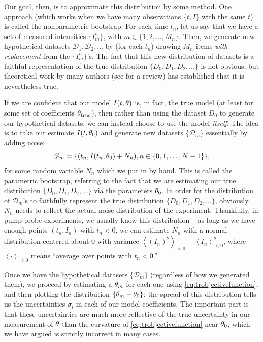 Our goal, then, is to approximate this distribution by some method.
One approach (which works when we have many observations $\{t, I\}$ with the same $t$) is called the nonparametric bootstrap\citep{cressie}.
For each time $t_n$, let us say that we have a set of measured intensities $\{I^n_m\}$, with $m\in \{1, 2, \ldots, M_n\}$.
Then, we generate new hypothetical datasets $\mathscr{D}_1, \mathscr{D}_2, \ldots$ by (for each $t_n$) drawing $M_n$ items \emph{with replacement} from the $\{I^n_m\}$'s.
The fact that this new distribution of datasets is a faithful representation of the true distribution $\{D_0, D_1, D_2, \ldots\}$ is not obvious, but theoretical work by many authors (see \citet{wackernagel} for a review) has established that it is nevertheless true.

If we are confident that our model $I(t, \theta)$ is, in fact, the true model (at least for some set of coefficients $\theta_\mathrm{true}$), then rather than using the dataset $D_0$ to generate our hypothetical datasets, we can instead choose to use the model \emph{itself}.
The idea is to take our estimate $I(t, \theta_0)$ and generate new datasets $\{\mathscr{D}_m\}$ essentially by adding noise:
\begin{equation}\label{eq:parametricbootstrap}
\mathscr{D}_m = \{(t_n, I(t_n, \theta_0)+N_n), n\in \{0, 1, \ldots, N-1\}\},
\end{equation}
for some random variable $N_n$ which we put in by hand.
This is called the parametric bootstrap, referring to the fact that we are estimating our true distribution $\{D_0, D_1, D_2, \ldots\}$ via the parameters $\theta_0$\citep{dekking}.
In order for the distribution of $\mathscr{D}_m$'s to faithfully represent the true distribution $\{D_0, D_1, D_2, \ldots\}$, obviously $N_n$ needs to reflect the actual noise distribution of the experiment.
Thankfully, in pump-probe experiments, we usually know this distribution -- as long as we have enough points $(t_n, I_n)$ with $t_n<0$, we can estimate $N_n$ with a normal distribution centered about $0$ with variance $\left<(I_n)^2\right>_{<0} - \left<I_n\right>_{<0}^2$, where $\left<\cdot\right>_{<0}$ means ``average over points with $t_n<0$.''

Once we have the hypothetical datasets $\{\mathscr{D}_m\}$ (regardless of how we generated them), we proceed by estimating a $\theta_m$ for each one using \cref{eq:trobjectivefunction}, and then plotting the distribution $\{\theta_m - \theta_0\}$; the spread of this distribution tells us the uncertainties $\sigma_i$ in each of our model coefficients.
The important part is that these uncertainties are much more reflective of the true uncertainty in our measurement of $\theta$ than the curvature of \cref{eq:trobjectivefunction} near $\theta_0$, which we have argued is strictly incorrect in many cases.
